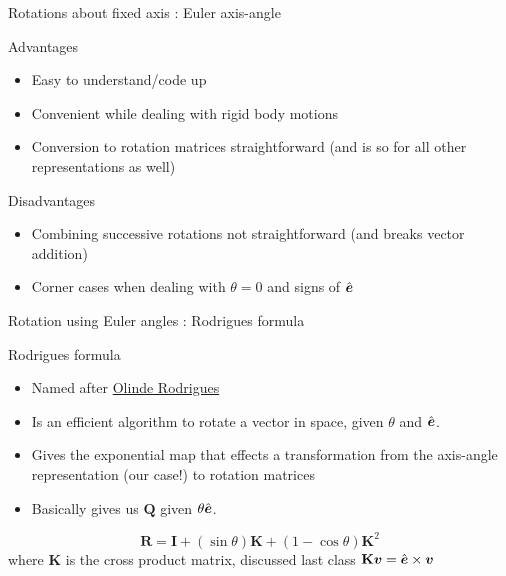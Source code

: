 \documentclass[presentation]{beamer}
\newcommand{\gv}[1]{\ensuremath{\mbox{\boldmath$ #1 $}}}
\newcommand{\bv}[1]{\ensuremath{\mathbf{#1}}}
\begin{document}
\begin{frame}[label={sec:orga2c628d}]{Rotations about fixed axis : Euler axis-angle}
\begin{block}{Advantages}
\begin{itemize}
\item Easy to understand/code up
\item Convenient while dealing with rigid body motions
\item Conversion to rotation matrices straightforward (and is so for all other
representations as well)
\end{itemize}
\end{block}
\begin{block}{Disadvantages}
\begin{itemize}
\item Combining successive rotations not straightforward (and breaks vector addition)
\item Corner cases when dealing with \(\theta = 0\) and signs of \(\hat{\gv{e}}\)
\end{itemize}
\end{block}
\end{frame}
\begin{frame}[label={sec:org6689d18}]{Rotation using Euler angles : Rodrigues formula}
\begin{block}{Rodrigues formula}
\begin{itemize}
\item Named after \href{https://en.wikipedia.org/wiki/Olinde\_Rodrigues}{Olinde Rodrigues}
\item Is an efficient algorithm to rotate a vector in space, given \(\theta\)
and \(\hat{\gv{e}}\).
\item Gives the exponential map that effects a transformation from the
axis-angle representation (our case!) to rotation matrices
\item Basically gives us \(\bv{Q}\) given \(\theta \hat{\gv{e}}\).
\end{itemize}
\[ \mathbf {R} =\mathbf {I} +(\sin \theta )\mathbf {K} +(1-\cos \theta )\mathbf {K} ^{2} \]
where \(\mathbf{K}\) is the cross product matrix, discussed last class \(\mathbf{K}\gv{v} = \hat{\gv{e}} \times \gv{v}\)
\end{block}
\end{frame}
\end{document}
